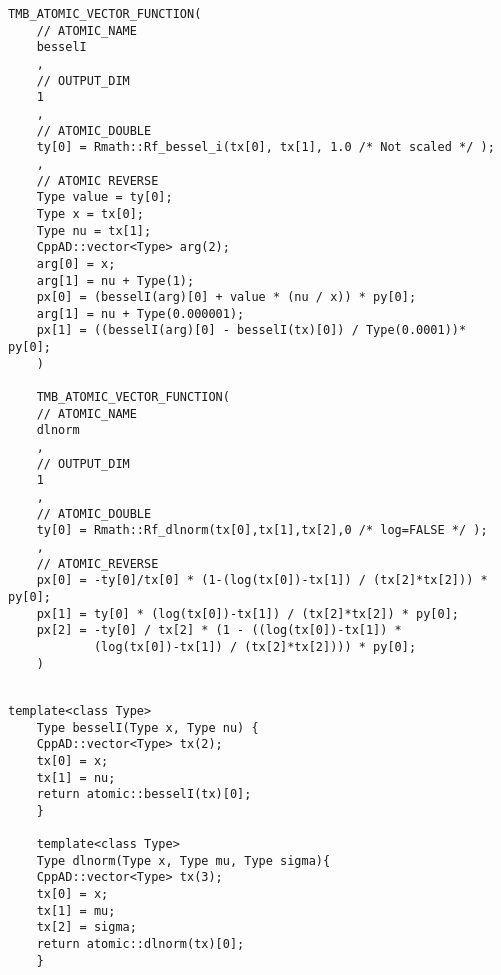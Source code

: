 \begin{frame}
	
	
	\begin{lstlisting}[caption={Addition to atomic\_math.hpp},label={lst:atomic_math},]
	TMB_ATOMIC_VECTOR_FUNCTION(
	// ATOMIC_NAME
	besselI
	,
	// OUTPUT_DIM
	1
	,
	// ATOMIC_DOUBLE
	ty[0] = Rmath::Rf_bessel_i(tx[0], tx[1], 1.0 /* Not scaled */ );
	,
	// ATOMIC REVERSE
	Type value = ty[0];
	Type x = tx[0];
	Type nu = tx[1];
	CppAD::vector<Type> arg(2);
	arg[0] = x;
	arg[1] = nu + Type(1);
	px[0] = (besselI(arg)[0] + value * (nu / x)) * py[0];
	arg[1] = nu + Type(0.000001);
	px[1] = ((besselI(arg)[0] - besselI(tx)[0]) / Type(0.0001))* py[0];
	)
	
	TMB_ATOMIC_VECTOR_FUNCTION(
	// ATOMIC_NAME
	dlnorm
	,
	// OUTPUT_DIM
	1
	,
	// ATOMIC_DOUBLE
	ty[0] = Rmath::Rf_dlnorm(tx[0],tx[1],tx[2],0 /* log=FALSE */ ); 
	,
	// ATOMIC_REVERSE
	px[0] = -ty[0]/tx[0] * (1-(log(tx[0])-tx[1]) / (tx[2]*tx[2])) * py[0];
	px[1] = ty[0] * (log(tx[0])-tx[1]) / (tx[2]*tx[2]) * py[0];
	px[2] = -ty[0] / tx[2] * (1 - ((log(tx[0])-tx[1]) * 
			(log(tx[0])-tx[1]) / (tx[2]*tx[2]))) * py[0];
	)
	
	\end{lstlisting}

	\begin{lstlisting}[caption={Addition to convenience.hpp},label={lst:convenience}]
	template<class Type>
	Type besselI(Type x, Type nu) {
	CppAD::vector<Type> tx(2);
	tx[0] = x;
	tx[1] = nu;
	return atomic::besselI(tx)[0];
	}
	
	template<class Type>
	Type dlnorm(Type x, Type mu, Type sigma){
	CppAD::vector<Type> tx(3);
	tx[0] = x;
	tx[1] = mu;
	tx[2] = sigma;
	return atomic::dlnorm(tx)[0];
	}
	\end{lstlisting}
	
\end{frame}

